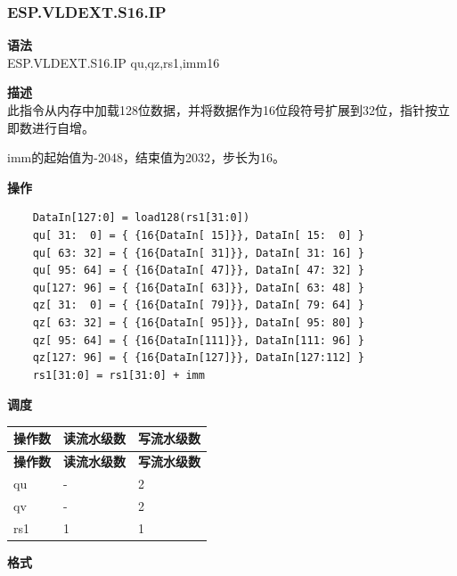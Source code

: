 \newpage

\newpage
\subsubsection{ESP.VLDEXT.S16.IP}\label{instruction:ESPVLDEXTS16IP}
\textbf{语法}\\
ESP.VLDEXT.S16.IP qu,qz,rs1,imm16

\textbf{描述}\\
此指令从内存中加载128位数据，并将数据作为16位段符号扩展到32位，指针按立即数进行自增。

imm的起始值为-2048，结束值为2032，步长为16。

\textbf{操作}\\
\begin{lstlisting}
    DataIn[127:0] = load128(rs1[31:0])
    qu[ 31:  0] = { {16{DataIn[ 15]}}, DataIn[ 15:  0] }
    qu[ 63: 32] = { {16{DataIn[ 31]}}, DataIn[ 31: 16] }
    qu[ 95: 64] = { {16{DataIn[ 47]}}, DataIn[ 47: 32] }
    qu[127: 96] = { {16{DataIn[ 63]}}, DataIn[ 63: 48] }
    qz[ 31:  0] = { {16{DataIn[ 79]}}, DataIn[ 79: 64] }
    qz[ 63: 32] = { {16{DataIn[ 95]}}, DataIn[ 95: 80] }
    qz[ 95: 64] = { {16{DataIn[111]}}, DataIn[111: 96] }
    qz[127: 96] = { {16{DataIn[127]}}, DataIn[127:112] }
    rs1[31:0] = rs1[31:0] + imm
\end{lstlisting}

\textbf{调度}\\
\begin{longtable}[c]{|l|l|l|}
    \hline
    \rowcolor{lightgray}
    \textbf{操作数} & \textbf{读流水级数} & \textbf{写流水级数} \\\hline
    \endfirsthead
    \hline
    \rowcolor{lightgray}
     \textbf{操作数} & \textbf{读流水级数} & \textbf{写流水级数} \\\hline
    \endhead
    \hline
    \endfoot

  qu & - & 2 \\\hline
  qv & - & 2 \\\hline
  rs1 & 1 & 1

\end{longtable}

\textbf{格式}\\

